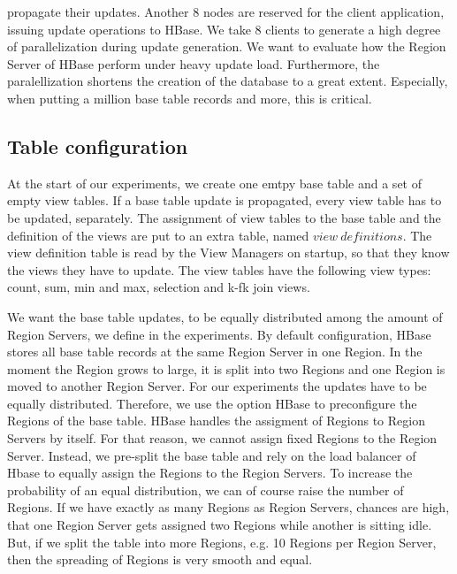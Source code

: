 \documentclass[11pt,a4paper,bibtotoc,idxtotoc,headsepline,footsepline,footexclude,BCOR12mm,DIV13]{scrbook}
\begin{document}
propagate their updates. Another 8 nodes are reserved for the client application, issuing update operations to HBase. We take 8 clients to generate a high degree of parallelization during update generation. We want to evaluate how the Region Server of HBase perform under heavy update load. Furthermore, the paralellization shortens the creation of the database to a great extent. Especially, when putting a million base table records and more, this is critical. 


\subsection{Table configuration}
\label{subsec:tableconfiguration}
At the start of our experiments, we create one emtpy base table and a set of empty view tables. If a base table update is propagated, every view table has to be updated, separately. The assignment of view tables to the base table and the definition of the views are put to an extra table, named $view\:definitions$. The view definition table is read by the View Managers on startup, so that they know the views they have to update. The view tables have the following view types: count, sum, min and max, selection and k-fk join views. 

We want the base table updates, to be equally distributed among the amount of Region Servers, we define in the experiments. By default configuration, HBase stores all base table records at the same Region Server in one Region. In the moment the Region grows to large, it is split into two Regions and one Region is moved to another Region Server. For our experiments the updates have to be equally distributed. Therefore, we use the option HBase to preconfigure the Regions of the base table. HBase handles the assigment of Regions to Region Servers by itself. For that reason, we cannot assign fixed Regions to the Region Server. Instead, we pre-split the base table and rely on the load balancer of Hbase to equally assign the Regions to the Region Servers. To increase the probability of an equal distribution, we can of course raise the number of Regions. If we have exactly as many Regions as Region Servers, chances are high, that one Region Server gets assigned two Regions while another is sitting idle. But, if we split the table into more Regions, e.g. 10 Regions per Region Server, then the spreading of Regions is very smooth and equal.
\end{document}
